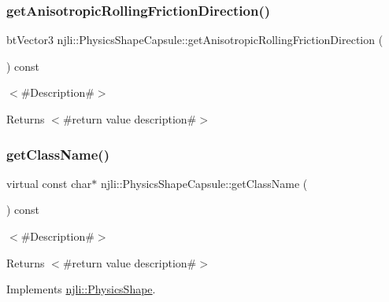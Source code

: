 \subsubsection{\texorpdfstring{get\+Anisotropic\+Rolling\+Friction\+Direction()}{getAnisotropicRollingFrictionDirection()}}
{\footnotesize\ttfamily bt\+Vector3 njli\+::\+Physics\+Shape\+Capsule\+::get\+Anisotropic\+Rolling\+Friction\+Direction (\begin{DoxyParamCaption}{ }\end{DoxyParamCaption}) const}

$<$\#\+Description\#$>$

\begin{DoxyReturn}{Returns}
$<$\#return value description\#$>$ 
\end{DoxyReturn}
\mbox{\label{classnjli_1_1_physics_shape_capsule_adf81c202808451b499e665d7db4a2e93}} 
\subsubsection{\texorpdfstring{get\+Class\+Name()}{getClassName()}}
{\footnotesize\ttfamily virtual const char$\ast$ njli\+::\+Physics\+Shape\+Capsule\+::get\+Class\+Name (\begin{DoxyParamCaption}{ }\end{DoxyParamCaption}) const\hspace{0.3cm}{\ttfamily [virtual]}}

$<$\#\+Description\#$>$

\begin{DoxyReturn}{Returns}
$<$\#return value description\#$>$ 
\end{DoxyReturn}


Implements \mbox{\hyperlink{classnjli_1_1_physics_shape_a72cb98a55614a3e264b8e4a157b45c64}{njli\+::\+Physics\+Shape}}.

\mbox{\label{classnjli_1_1_physics_shape_capsule_a1a319c965b9b504353759dd8729944e1}} 
